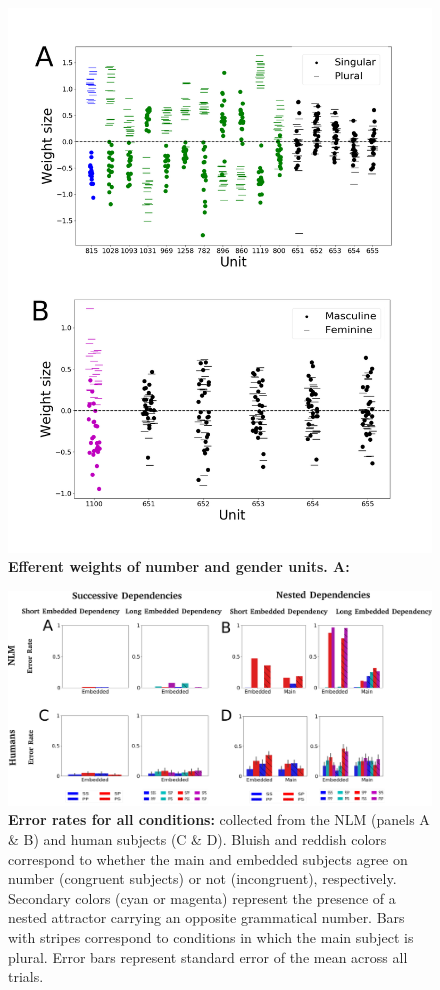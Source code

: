 \documentclass[a4paper, 11pt]{article}
\begin{document}
\begin{figure}
    \centering
    \includegraphics[width=\linewidth]{figures/SM/FigureS2_output_weights.png}
    \caption{\textbf{\textbf{Efferent weights of number and gender units}. A: }}
    \label{fig:ablation_all_models}
\end{figure}

\begin{figure}
    \centering
    \includegraphics[width=16cm]{figures/SM/error_rates_all_conditions.png}
    \caption{\textbf{Error rates for all conditions:} collected from the NLM (panels A \& B) and human subjects (C \& D). Bluish and reddish colors correspond to whether the main and embedded subjects agree on number (congruent subjects) or not (incongruent), respectively. Secondary colors (cyan or magenta) represent the presence of a nested attractor carrying an opposite grammatical number. Bars with stripes correspond to conditions in which the main subject is plural. Error bars represent standard error of the mean across all trials.}
    \label{fig:error_rates_all_conditions}
\end{figure}
\end{document}
